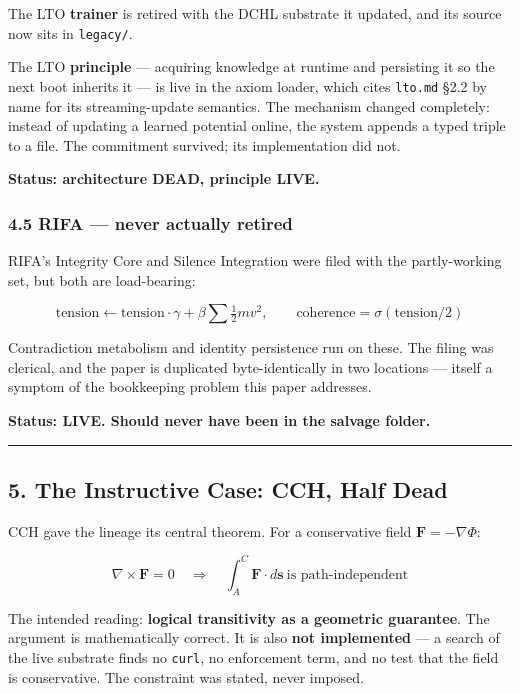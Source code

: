 \documentclass[
  11pt,
  a4paper,
]{article}
\begin{document}
The LTO \textbf{trainer} is retired with the DCHL substrate it updated,
and its source now sits in \texttt{legacy/}.

The LTO \textbf{principle} --- acquiring knowledge at runtime and
persisting it so the next boot inherits it --- is live in the axiom
loader, which cites \texttt{lto.md} §2.2 by name for its
streaming-update semantics. The mechanism changed completely: instead of
updating a learned potential online, the system appends a typed triple
to a file. The commitment survived; its implementation did not.

\textbf{Status: architecture DEAD, principle LIVE.}

\subsubsection{4.5 RIFA --- never actually
retired}\label{rifa-never-actually-retired}

RIFA's Integrity Core and Silence Integration were filed with the
partly-working set, but both are load-bearing:

\[
\text{tension} \leftarrow \text{tension}\cdot\gamma + \beta \textstyle\sum \tfrac12 m v^2,
\qquad
\text{coherence} = \sigma(\text{tension}/2)
\]

Contradiction metabolism and identity persistence run on these. The
filing was clerical, and the paper is duplicated byte-identically in two
locations --- itself a symptom of the bookkeeping problem this paper
addresses.

\textbf{Status: LIVE. Should never have been in the salvage folder.}

\begin{center}\rule{0.5\linewidth}{0.5pt}\end{center}

\subsection{5. The Instructive Case: CCH, Half
Dead}\label{the-instructive-case-cch-half-dead}

CCH gave the lineage its central theorem. For a conservative field
\(\mathbf{F} = -\nabla\Phi\):

\[
\nabla \times \mathbf{F} = 0
\quad\Longrightarrow\quad
\int_A^C \mathbf{F}\cdot d\mathbf{s} \ \text{is path-independent}
\]

The intended reading: \textbf{logical transitivity as a geometric
guarantee}. The argument is mathematically correct. It is also
\textbf{not implemented} --- a search of the live substrate finds no
\texttt{curl}, no enforcement term, and no test that the field is
conservative. The constraint was stated, never imposed.
\end{document}
